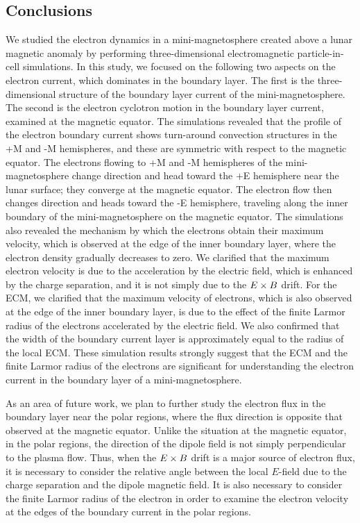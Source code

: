 \documentclass[draft,jgrga]{agutex2015}
\begin{document}
\begin{article}
\section{Conclusions}
We studied the electron dynamics in 
a mini-magnetosphere created above a lunar magnetic anomaly
by performing three-dimensional electromagnetic particle-in-cell simulations.
In this study, we focused on the following two aspects on the
electron current, which dominates in the boundary layer.
The first is the three-dimensional structure of 
the boundary layer current of the mini-magnetosphere. 
The second is the electron cyclotron motion 
in the boundary layer current, examined at the magnetic equator.
The simulations revealed that the profile of 
the electron boundary current shows 
turn-around convection structures 
in the +M and -M hemispheres, and these are symmetric with respect to the magnetic equator.
The electrons flowing to +M and -M hemispheres 
of the mini-magnetosphere
change direction and head toward the +E hemisphere 
near the lunar surface; they converge at the magnetic equator. 
The electron flow then changes direction and heads toward the -E hemisphere, 
traveling along the inner boundary of the mini-magnetosphere on the magnetic equator.
The simulations also revealed the mechanism by which the electrons obtain their maximum velocity, which is
observed at the edge of the inner boundary layer,
where the electron density gradually decreases to zero.
We clarified that the maximum electron velocity
is due to the acceleration by the electric field, which is
enhanced by the charge separation, and it is 
not simply due to the $\mbox{\boldmath $E$} \times \mbox{\boldmath $B$}$ drift.
For the ECM, we clarified that 
the maximum velocity of electrons, which is also observed 
at the edge of the inner boundary layer, is due to 
the effect of the finite Larmor radius of the electrons 
accelerated by the electric field.
We also confirmed that the width of the boundary current layer 
is approximately equal to the radius of the local ECM.
These simulation results strongly suggest that the 
ECM and the finite Larmor radius of the electrons are significant 
for understanding the electron current in the boundary layer of a mini-magnetosphere. 

As an area of future work, 
we plan to further study the electron flux in the boundary layer 
near the polar regions, where the flux direction is opposite 
that observed at the magnetic equator.
Unlike the situation at the magnetic equator, in the polar regions,
the direction of the dipole field is not simply 
perpendicular to the plasma flow. 
Thus, when
the $\mbox{\boldmath $E$} \times \mbox{\boldmath $B$}$ drift 
is a major source of electron flux, it is necessary to consider the relative angle between
the local $E$-field due to the charge separation and 
the dipole magnetic field.
It is also necessary to consider the finite Larmor radius 
of the electron in order to examine the electron velocity 
at the edges of the boundary current in the polar regions.


\end{article}
\end{document}
